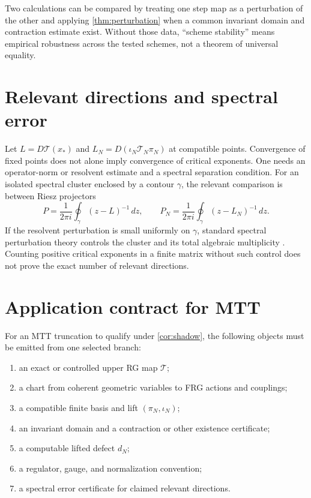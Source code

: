 \documentclass[11pt]{article}
\theoremstyle{definition}
\theoremstyle{remark}
\newcommand{\Tmap}{\mathcal T}
\newcommand{\TN}{\mathcal T_N}
\newcommand{\iotaN}{\iota_N}
\newcommand{\piN}{\pi_N}
\begin{document}
Two calculations can be compared by treating one step map as a perturbation
of the other and applying \autoref{thm:perturbation} when a common invariant
domain and contraction estimate exist. Without those data, ``scheme
stability'' means empirical robustness across the tested schemes, not a
theorem of universal equality.

\section{Relevant directions and spectral error}

Let \(L=D\Tmap(x_\ast)\) and
\(L_N=D(\iotaN\TN\piN)\) at compatible points. Convergence of fixed points
does not alone imply convergence of critical exponents. One needs an
operator-norm or resolvent estimate and a spectral separation condition.
For an isolated spectral cluster enclosed by a contour \(\gamma\), the
relevant comparison is between Riesz projectors
\[
 P=\frac{1}{2\pi i}\oint_\gamma(z-L)^{-1}\,dz,
 \qquad
 P_N=\frac{1}{2\pi i}\oint_\gamma(z-L_N)^{-1}\,dz.
\]
If the resolvent perturbation is small uniformly on \(\gamma\), standard
spectral perturbation theory controls the cluster and its total algebraic
multiplicity \cite{Kato}. Counting positive critical exponents in a finite
matrix without such control does not prove the exact number of relevant
directions.

\section{Application contract for MTT}

For an MTT truncation to qualify under \autoref{cor:shadow}, the following
objects must be emitted from one selected branch:

\begin{enumerate}
\item an exact or controlled upper RG map \(\Tmap\);
\item a chart from coherent geometric variables to FRG actions and
couplings;
\item a compatible finite basis and lift \((\piN,\iotaN)\);
\item an invariant domain and a contraction or other existence certificate;
\item a computable lifted defect \(d_N\);
\item a regulator, gauge, and normalization convention;
\item a spectral error certificate for claimed relevant directions.
\end{enumerate}
\end{document}

